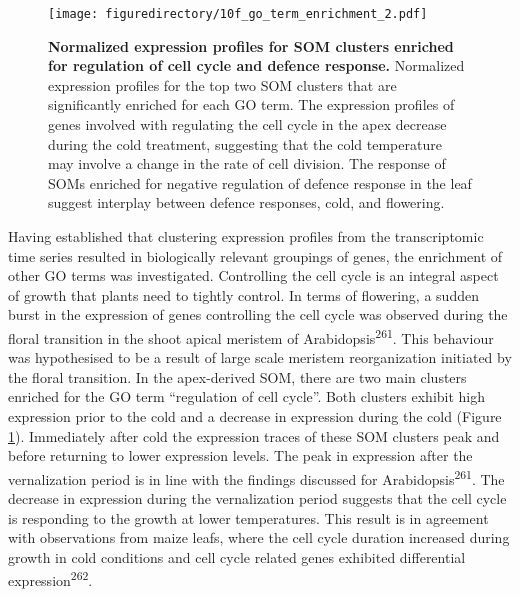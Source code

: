 \documentclass[12pt,]{book}
\begin{document}
\begin{figure}[htbp]
\centering
\texttt{[image: figuredirectory/10f\_go\_term\_enrichment\_2.pdf]}
\caption{\textbf{Normalized expression profiles for SOM clusters
enriched for regulation of cell cycle and defence response.} Normalized
expression profiles for the top two SOM clusters that are significantly
enriched for each GO term. The expression profiles of genes involved
with regulating the cell cycle in the apex decrease during the cold
treatment, suggesting that the cold temperature may involve a change in
the rate of cell division. The response of SOMs enriched for negative
regulation of defence response in the leaf suggest interplay between
defence responses, cold, and flowering.}\label{figure:220:go2som}
\end{figure}

Having established that clustering expression profiles from the
transcriptomic time series resulted in biologically relevant groupings
of genes, the enrichment of other GO terms was investigated. Controlling
the cell cycle is an integral aspect of growth that plants need to
tightly control. In terms of flowering, a sudden burst in the expression
of genes controlling the cell cycle was observed during the floral
transition in the shoot apical meristem of
Arabidopsis\textsuperscript{261}. This behaviour was hypothesised to be
a result of large scale meristem reorganization initiated by the floral
transition. In the apex-derived SOM, there are two main clusters
enriched for the GO term ``regulation of cell cycle''. Both clusters
exhibit high expression prior to the cold and a decrease in expression
during the cold (Figure \ref{figure:220:go2som}). Immediately after cold
the expression traces of these SOM clusters peak and before returning to
lower expression levels. The peak in expression after the vernalization
period is in line with the findings discussed for
Arabidopsis\textsuperscript{261}. The decrease in expression during the
vernalization period suggests that the cell cycle is responding to the
growth at lower temperatures. This result is in agreement with
observations from maize leafs, where the cell cycle duration increased
during growth in cold conditions and cell cycle related genes exhibited
differential expression\textsuperscript{262}.
\end{document}
